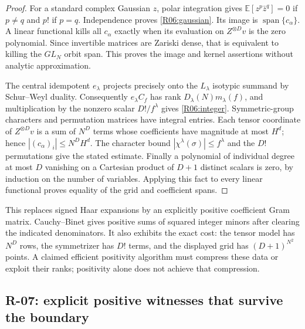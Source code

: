 \documentclass[11pt,a4paper]{article}
\theoremstyle{definition}\newtheorem{definition}{Definition}
\begin{document}
\begin{proof}
For a standard complex Gaussian $z$, polar integration gives
$\mathbb E[z^p\bar z^q]=0$ if $p\ne q$ and $p!$ if $p=q$.
Independence proves \eqref{R06:gaussian}. Its image is
$\operatorname{span}\{c_\alpha\}$. A linear functional kills all
$c_\alpha$ exactly when its evaluation on $Z^{\otimes D}v$ is the zero
polynomial. Since invertible matrices are Zariski dense, that is
equivalent to killing the $GL_N$ orbit span. This proves the image and
kernel assertions without analytic approximation.

The central idempotent $e_\lambda$ projects precisely onto the
$L_\lambda$ isotypic summand by Schur--Weyl duality. Consequently
$e_\lambda C_f$ has rank $D_\lambda(N)m_\lambda(f)$, and multiplication
by the nonzero scalar $D!/f^\lambda$ gives \eqref{R06:integer}.
Symmetric-group characters and permutation matrices have integral
entries. Each tensor coordinate of $Z^{\otimes D}v$ is a sum of $N^D$
terms whose coefficients have magnitude at most $H^d$; hence
$|(c_\alpha)_i|\leq N^D H^d$. The character bound
$|\chi^\lambda(\sigma)|\leq f^\lambda$ and the $D!$ permutations give
the stated estimate. Finally a polynomial of individual degree at
most $D$ vanishing on a Cartesian product of $D+1$ distinct scalars is
zero, by induction on the number of variables. Applying this fact to
every linear functional proves equality of the grid and coefficient
spans.
\end{proof}

This replaces signed Haar expansions by an explicitly positive
coefficient Gram matrix. Cauchy--Binet gives positive sums of squared
integer minors after clearing the indicated denominators. It also
exhibits the exact cost: the tensor model has $N^D$ rows, the
symmetrizer has $D!$ terms, and the displayed grid has
$(D+1)^{N^2}$ points. A claimed efficient positivity algorithm must
compress these data or exploit their ranks; positivity alone does
not achieve that compression.

\subsection{R-07: explicit positive witnesses that survive the boundary}
\end{document}

